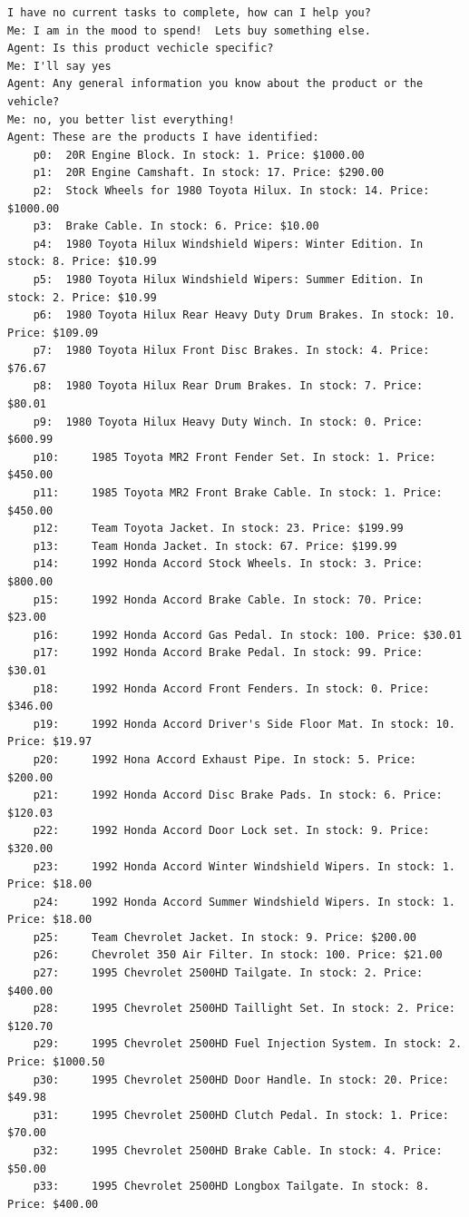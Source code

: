 \documentclass[11pt, titlepage]{article}
\begin{document}
\begin{lstlisting}
I have no current tasks to complete, how can I help you?
Me: I am in the mood to spend!  Lets buy something else.
Agent: Is this product vechicle specific?
Me: I'll say yes
Agent: Any general information you know about the product or the vehicle?
Me: no, you better list everything!
Agent: These are the products I have identified:
	p0:	 20R Engine Block. In stock: 1. Price: $1000.00
	p1:	 20R Engine Camshaft. In stock: 17. Price: $290.00
	p2:	 Stock Wheels for 1980 Toyota Hilux. In stock: 14. Price: $1000.00
	p3:	 Brake Cable. In stock: 6. Price: $10.00
	p4:	 1980 Toyota Hilux Windshield Wipers: Winter Edition. In stock: 8. Price: $10.99
	p5:	 1980 Toyota Hilux Windshield Wipers: Summer Edition. In stock: 2. Price: $10.99
	p6:	 1980 Toyota Hilux Rear Heavy Duty Drum Brakes. In stock: 10. Price: $109.09
	p7:	 1980 Toyota Hilux Front Disc Brakes. In stock: 4. Price: $76.67
	p8:	 1980 Toyota Hilux Rear Drum Brakes. In stock: 7. Price: $80.01
	p9:	 1980 Toyota Hilux Heavy Duty Winch. In stock: 0. Price: $600.99
	p10:	 1985 Toyota MR2 Front Fender Set. In stock: 1. Price: $450.00
	p11:	 1985 Toyota MR2 Front Brake Cable. In stock: 1. Price: $450.00
	p12:	 Team Toyota Jacket. In stock: 23. Price: $199.99
	p13:	 Team Honda Jacket. In stock: 67. Price: $199.99
	p14:	 1992 Honda Accord Stock Wheels. In stock: 3. Price: $800.00
	p15:	 1992 Honda Accord Brake Cable. In stock: 70. Price: $23.00
	p16:	 1992 Honda Accord Gas Pedal. In stock: 100. Price: $30.01
	p17:	 1992 Honda Accord Brake Pedal. In stock: 99. Price: $30.01
	p18:	 1992 Honda Accord Front Fenders. In stock: 0. Price: $346.00
	p19:	 1992 Honda Accord Driver's Side Floor Mat. In stock: 10. Price: $19.97
	p20:	 1992 Hona Accord Exhaust Pipe. In stock: 5. Price: $200.00
	p21:	 1992 Honda Accord Disc Brake Pads. In stock: 6. Price: $120.03
	p22:	 1992 Honda Accord Door Lock set. In stock: 9. Price: $320.00
	p23:	 1992 Honda Accord Winter Windshield Wipers. In stock: 1. Price: $18.00
	p24:	 1992 Honda Accord Summer Windshield Wipers. In stock: 1. Price: $18.00
	p25:	 Team Chevrolet Jacket. In stock: 9. Price: $200.00
	p26:	 Chevrolet 350 Air Filter. In stock: 100. Price: $21.00
	p27:	 1995 Chevrolet 2500HD Tailgate. In stock: 2. Price: $400.00
	p28:	 1995 Chevrolet 2500HD Taillight Set. In stock: 2. Price: $120.70
	p29:	 1995 Chevrolet 2500HD Fuel Injection System. In stock: 2. Price: $1000.50
	p30:	 1995 Chevrolet 2500HD Door Handle. In stock: 20. Price: $49.98
	p31:	 1995 Chevrolet 2500HD Clutch Pedal. In stock: 1. Price: $70.00
	p32:	 1995 Chevrolet 2500HD Brake Cable. In stock: 4. Price: $50.00
	p33:	 1995 Chevrolet 2500HD Longbox Tailgate. In stock: 8. Price: $400.00

\end{lstlisting}
\end{document}
